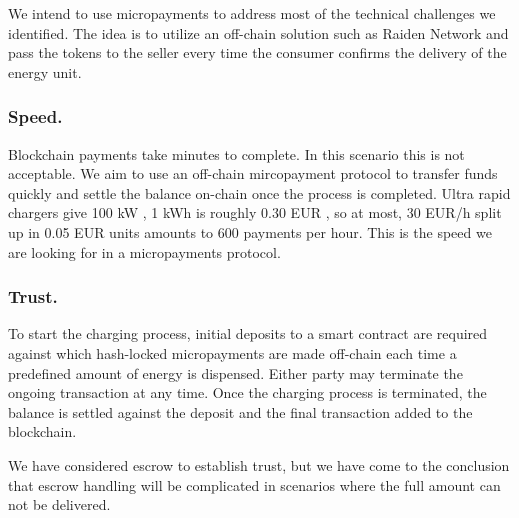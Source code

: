\documentclass[10pt]{adtreport}
\begin{document}
We intend to use micropayments to address most of the technical challenges we identified. The idea is to utilize an off-chain solution such as Raiden Network \cite{raiden} and pass the tokens to the seller every time the consumer confirms the delivery of the energy unit.

\subsubsection{Speed.}
Blockchain payments take minutes to complete. In this scenario this is not acceptable. We aim to use an off-chain mircopayment protocol to transfer funds quickly and settle the balance on-chain once the process is completed. Ultra rapid chargers give 100 kW \cite{tesla-charge}, 1 kWh is roughly 0.30 EUR \cite{bmwi}, so at most, 30 EUR/h split up in 0.05 EUR units amounts to 600 payments per hour. This is the speed we are looking for in a micropayments protocol.

\subsubsection{Trust.}


To start the charging process, initial deposits to a smart contract are required against which hash-locked micropayments are made off-chain each time a predefined amount of energy is dispensed. Either party may terminate the ongoing transaction at any time. Once the charging process is terminated, the balance is settled against the deposit and the final transaction added to the blockchain.

We have considered escrow to establish trust, but we have come to the conclusion that escrow handling will be complicated in scenarios where the full amount can not be delivered. 
\end{document}
